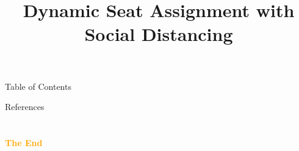 \documentclass[aspectratio=43]{beamer}
\title{Dynamic Seat Assignment with Social Distancing} %
\subtitle{}
\institute[HKUST]{
    IEDA%
    \\%
    The Hong Kong University of Science and Technology%
} %
\date{}
\begin{document}
    \frame{\titlepage}
    \begin{frame}{Table of Contents}
        \tableofcontents
    \end{frame}
    
    
    
    
    
    
    
    
    \renewcommand*{\bibfont}{\scriptsize}
    \begin{frame}{References}
        \printbibliography
    \end{frame}

    \section{}
    \begin{frame}{}
        \centering
            \Huge\bfseries
        \textcolor{orange}{The End}
    \end{frame}
\end{document}

